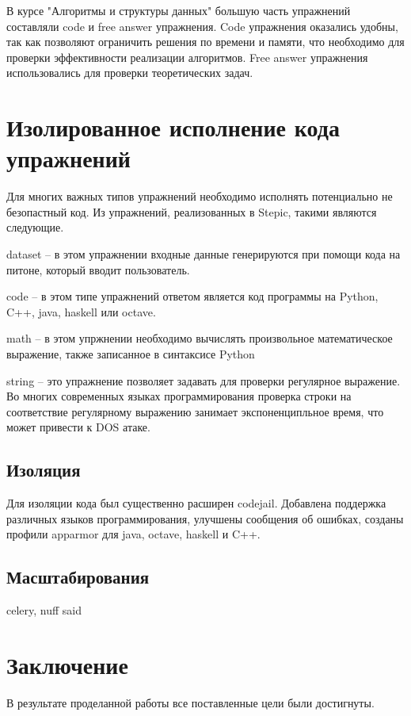 \documentclass{matmex-diploma-custom}
\begin{document}
В курсе "Алгоритмы и структуры данных" большую часть упражнений
составляли code и free answer упражнения. Code упражнения оказались
удобны, так как позволяют ограничить решения по времени и памяти, что
необходимо для проверки эффективности реализации алгоритмов. Free
answer упражнения использовались для проверки теоретических задач.

\section{Изолированное исполнение кода упражнений}

Для многих важных типов упражнений необходимо исполнять потенциально
не безопастный код. Из упражнений, реализованных в Stepic, такими
являются следующие.

dataset -- в этом упражнении входные данные генерируются при помощи
кода на питоне, который вводит пользователь.

code -- в этом типе упражнений ответом является код программы на
Python, C++, java, haskell или octave.

math -- в этом упржнении необходимо вычислять произвольное
математическое выражение, также записанное в синтаксисе Python

string -- это упражнение позволяет задавать для проверки регулярное
выражение. Во многих современных языках программирования проверка
строки на соответствие регулярному выражению занимает экспоненципльное
время, что может привести к DOS атаке.

\subsection{Изоляция}

Для изоляции кода был существенно расширен codejail. Добавлена
поддержка различных языков программирования, улучшены сообщения об
ошибках, созданы профили apparmor для java, octave, haskell и C++.

\subsection{Масштабирования}
celery, nuff said

\section*{Заключение}
В результате проделанной работы все поставленные цели были
достигнуты.
\end{document}
